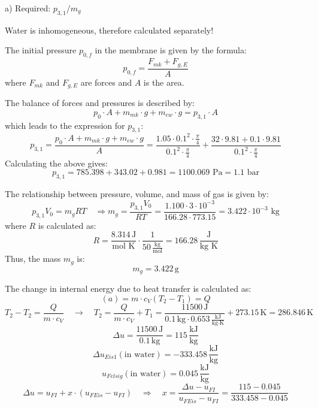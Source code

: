 a) Required: \( p_{3,1} / m_g \)

Water is inhomogeneous, therefore calculated separately!

The initial pressure \( p_{0,f} \) in the membrane is given by the formula:
\[
p_{0,f} = \frac{F_{mk} + F_{g,E}}{A}
\]
where \( F_{mk} \) and \( F_{g,E} \) are forces and \( A \) is the area.

The balance of forces and pressures is described by:
\[
p_0 \cdot A + m_{mk} \cdot g + m_{ew} \cdot g = p_{3,1} \cdot A
\]
which leads to the expression for \( p_{3,1} \):
\[
p_{3,1} = \frac{p_0 \cdot A + m_{mk} \cdot g + m_{ew} \cdot g}{A} = \frac{1.05 \cdot 0.1^2 \cdot \frac{\pi}{4}}{0.1^2 \cdot \frac{\pi}{4}} + \frac{32 \cdot 9.81 + 0.1 \cdot 9.81}{0.1^2 \cdot \frac{\pi}{4}}
\]
Calculating the above gives:
\[
p_{3,1} = 785.398 + 343.02 + 0.981 = 1100.069 \text{ Pa} = 1.1 \text{ bar}
\]

The relationship between pressure, volume, and mass of gas is given by:
\[
p_{3,1} V_0 = m_g R T \quad \Rightarrow m_g = \frac{p_{3,1} V_0}{R T} = \frac{1.100 \cdot 3 \cdot 10^{-3}}{166.28 \cdot 773.15} = 3.422 \cdot 10^{-3} \text{ kg}
\]
where \( R \) is calculated as:
\[
R = \frac{8.314 \, \text{J}}{\text{mol K}} \cdot \frac{1}{50 \, \frac{\text{kg}}{\text{mol}}} = 166.28 \, \frac{\text{J}}{\text{kg K}}
\]
Thus, the mass \( m_g \) is:
\[
m_g = 3.422 \, \text{g}
\]

The change in internal energy due to heat transfer is calculated as:
\[
(a) = m \cdot c_V (T_2 - T_1) = Q
\]
\[
T_2 - T_2 = \frac{Q}{m \cdot c_V} \quad \rightarrow \quad T_2 = \frac{Q}{m \cdot c_V} + T_1 = \frac{11500 \, \text{J}}{0.1 \, \text{kg} \cdot 0.653 \, \frac{\text{kJ}}{\text{kg} \cdot \text{K}}} + 273.15 \, \text{K} = 286.846 \, \text{K}
\]
\[
\Delta u = \frac{11500 \, \text{J}}{0.1 \, \text{kg}} = 115 \, \frac{\text{kJ}}{\text{kg}}
\]
\[
\Delta u_{Eis1} (\text{in water}) = -333.458 \, \frac{\text{kJ}}{\text{kg}}
\]
\[
u_{Felsig} (\text{in water}) = 0.045 \, \frac{\text{kJ}}{\text{kg}}
\]
\[
\Delta u = u_{FI} + x \cdot (u_{FEis} - u_{FI}) \quad \Rightarrow \quad x = \frac{\Delta u - u_{FI}}{u_{FEis} - u_{FI}} = \frac{115 - 0.045}{333.458 - 0.045}
\]